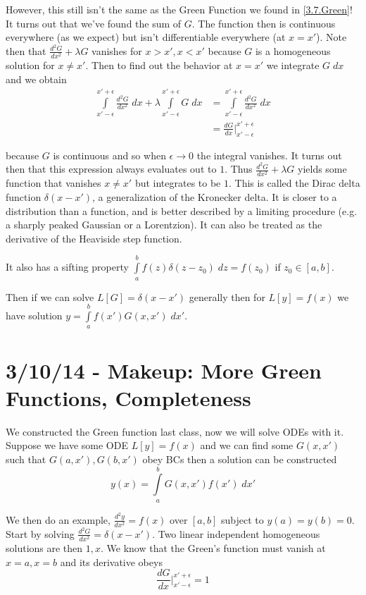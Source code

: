 \documentclass[10pt]{report}
\newcommand{\rtd}[2]{\frac{d^2#1}{d#2^2}}
\newcommand{\rd}[2]{\frac{d#1}{d#2}}
\begin{document}
However, this still isn't the same as the Green Function we found in \eqref{3.7.Green}! It turns out that we've found the sum of $G$. The function then is continuous everywhere (as we expect) but isn't differentiable everywhere (at $x=x'$). Note then that $\rtd{G}{x} + \lambda G$ vanishes for $x > x', x < x'$ because $G$ is a homogeneous solution for $x \neq x'$. Then to find out the behavior at $x=x'$ we integrate $G\; dx$ and we obtain
\begin{align}
    \displaystyle\int\limits_{x' - \epsilon}^{x' + \epsilon}\rtd{G}{x}\;dx + \lambda \displaystyle\int\limits_{x' - \epsilon}^{x' + \epsilon}G\; dx &= \displaystyle\int\limits_{x' - \epsilon}^{x' + \epsilon}\rtd{G}{x}\;dx\\
    &= \rd{G}{x}\Big|_{x' - \epsilon}^{x' + \epsilon}
\end{align}

because $G$ is continuous and so when $\epsilon \to 0$ the integral vanishes. It turns out then that this expression always evaluates out to $1$. Thus $\rtd{G}{x} + \lambda G$ yields some function that vanishes $x \neq x'$ but integrates to be $1$. This is called the Dirac delta function $\delta(x-x')$, a generalization of the Kronecker delta. It is closer to a distribution than a function, and is better described by a limiting procedure (e.g. a sharply peaked Gaussian or a Lorentzion). It can also be treated as the derivative of the Heaviside step function. 

It also has a sifting property $\displaystyle\int\limits_{a}^{b}f(z) \delta(z-z_0)\;dz = f(z_0)$ if $z_0 \in [a,b]$. 

Then if we can solve $L[G] = \delta(x-x')$ generally then for $L[y] = f(x)$ we have solution $y = \displaystyle\int\limits_{a}^{b}f(x')G(x,x')\;dx'$. 
\chapter{3/10/14 - Makeup: More Green Functions, Completeness}

We constructed the Green function last class, now we will solve ODEs with it. Suppose we have some ODE $L[y] = f(x)$ and we can find some $G(x,x')$ such that $G(a,x') , G(b,x')$ obey BCs then a solution can be constructed
\begin{equation}
    y(x) = \displaystyle\int\limits_{a}^{b}G(x,x')f(x')\;dx'
\end{equation}

We then do an example, $\rtd{y}{x} = f(x)$ over $[a,b]$ subject to $y(a) = y(b) = 0$. Start by solving $\rtd{G}{x} = \delta(x-x')$. Two linear independent homogeneous solutions are then $1,x$. We know that the Green's function must vanish at $x=a, x=b$ and its derivative obeys
\begin{equation}
    \rd{G}{x}\Big|_{x' - \epsilon}^{x' + \epsilon} = 1
\end{equation}
\end{document}
